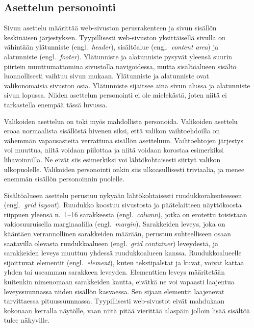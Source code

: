 \documentclass[finnish, 12pt, a4paper, elec, utf8, a-1b, online]{aaltothesis}
\begin{document}
\subsection{Asettelun personointi}\label{layout-personalization}

Sivun asettelu määrittää web-sivuston perusrakenteen ja sivun sisällön
keskinäisen järjestyksen. Tyypillisesti web-sivuston yksittäisellä sivulla on
vähintään ylätunniste (engl.~\textit{header}), sisältöalue
(engl.~\textit{content area}) ja alatunniste (engl.~\textit{footer}).
Ylätunniste ja alatunniste pysyvät yleensä suurin piirtein muuttumattomina
sivustolla navigoidessa, mutta sisältöalueen sisältö luonnollisesti vaihtuu
sivun mukaan. Ylätunniste ja alatunniste ovat valikonomaisia sivuston osia.
Ylätunniste sijaitsee aina sivun alussa ja alatunniste sivun lopussa. Niiden
asettelun personointi ei ole mielekästä, joten niitä ei tarkastella enempää
tässä luvussa.

Valikoiden asettelua on toki myös mahdollista personoida. Valikoiden asettelu
eroaa normaalista sisällöstä hivenen siksi, että valikon vaihtoehdoilla on
vähemmän vapausasteita verrattuna sisällön asetteluun. Vaihtoehtojen järjestys
voi muuttua, niitä voidaan piilottaa ja niitä voidaan korostaa esimerkiksi
lihavoinnilla. Ne eivät siis esimerkiksi voi lähtökohtaisesti siirtyä valikon
ulkopuolelle. Valikoiden personointi onkin siis ulkoasullisesti triviaalia, ja
menee enemmän sisällön personoinnin puolelle.

Sisältöalueen asettelu perustuu nykyään lähtökohtaisesti ruudukkorakenteeseen
(engl.~\textit{grid layout}). Ruudukko koostuu sivustosta ja päätelaitteen
näyttökoosta riippuen yleensä n.~1--16 sarakkeesta (engl.~\textit{column}),
jotka on erotettu toisistaan vakiosuuruisella marginaalilla
(engl.~\textit{margin}). Sarakkeiden leveys, joka on kääntäen verrannollinen
sarakkeiden määrään, perustuu suhteelliseen osaan saatavilla olevasta
ruudukkoalueen (engl.~\textit{grid container}) leveydestä, ja sarakkeiden leveys
muuttuu yhdessä ruudukkoalueen kanssa. Ruudukkoalueelle sijoittuvat elementit
(engl.~\textit{element}), kuten tekstipalstat ja kuvat, voivat kattaa yhden tai
useamman sarakkeen leveyden. Elementtien leveys määritetään kuitenkin nimenomaan
sarakkeiden kautta, eivätkä ne voi vapaasti laajentua leveyssuunnassa niiden
sisällön kasvaessa. Sen sijaan elementit laajenevat tarvittaessa
pituussuunnassa. Tyypillisesti web-sivustot eivät mahdukaan kokonaan kerralla
näytölle, vaan niitä pitää vierittää alaspäin jolloin lisää sisältöä tulee
näkyville.
\end{document}
